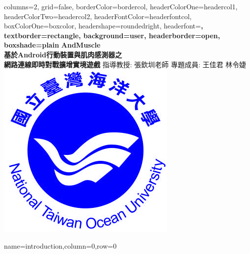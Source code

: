 \documentclass[a0paper,portrait]{baposter}
\begin{document}
\begin{poster}{
columns=2,
grid=false,
borderColor=bordercol, %
headerColorOne=headercol1, %
headerColorTwo=headercol2, %
headerFontColor=headerfontcol, %
boxColorOne=boxcolor, %
headershape=roundedright, %
headerfont=\Large\sf\bf, %
textborder=rectangle,
background=user,
headerborder=open, %
boxshade=plain
}
{}
%
%
{\sf\bf AndMuscle \\ \smaller \smaller 基於Android行動裝置與肌肉感測器之 \\ 網路連線即時對戰擴增實境遊戲} %
{\vspace{1em} 指導教授: 張欽圳\space 老師
 \space \space 專題成員: 王佳君 \space 林令婕 %
}
{\includegraphics[scale=1.0]{ntoulogo}} %



{name=introduction,column=0,row=0}{

}
\end{poster}
\end{document}
